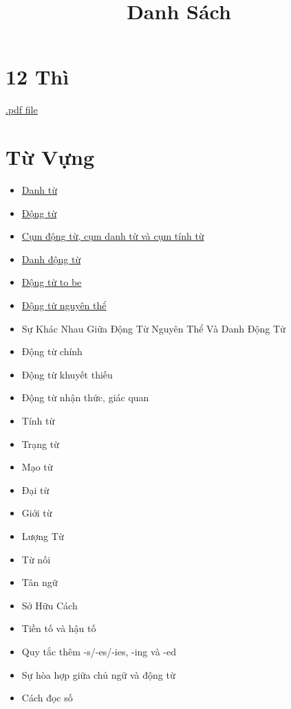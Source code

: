 \title{\Huge \textbf{Danh Sách}}
\maketitle
\tableofcontents

\chapter{12 Thì}
\href{https://github.com/theslime016/english-project/blob/main/english-project-release-files/12Tenses.pdf}
{.pdf file}
\chapter{Từ Vựng}
\begin{multicols*}{2}
    \begin{itemize}
        \item \href{https://github.com/theslime016/english-project/blob/main/english-project-release-files/Chapter-1/12Tenses.pdf}{Danh từ}
        \item \href{https://github.com/theslime016/english-project/blob/main/english-project-release-files/Chapter-2/Verb.pdf}{Động từ}
        \item \href{https://github.com/theslime016/english-project/blob/main/english-project-release-files/Chapter-2/Phrasal.pdf}{Cụm động từ, cụm danh từ và cụm tính từ}
        \item \href{https://github.com/theslime016/english-project/blob/main/english-project-release-files/Chapter-2/Gerunds.pdf}{Danh động từ}
        \item \href{https://github.com/theslime016/english-project/blob/main/english-project-release-files/Chapter-2/To%20be%20Verbs.pdf}{Động từ to be}
        \item \href{https://github.com/theslime016/english-project/blob/main/english-project-release-files/Chapter-2/Inifinitives.pdf}{Động từ nguyên thể}
        \item Sự Khác Nhau Giữa Động Từ Nguyên Thể Và Danh Động Từ
        \item Động từ chính
        \item Động từ khuyết thiếu
        \item Động từ nhận thức, giác quan
        \item Tính từ
        \item Trạng từ
        \item Mạo từ
        \item Đại từ
        \item Giới từ
        \item Lượng Từ
        \item Từ nối
        \item Tân ngữ
        \item Sở Hữu Cách
        \item Tiền tố và hậu tố
        \item Quy tắc thêm -s/-es/-ies, -ing và -ed
        \item Sự hòa hợp giữa chủ ngữ và động từ
        \item Cách đọc số
    \end{itemize}
\end{multicols*}


